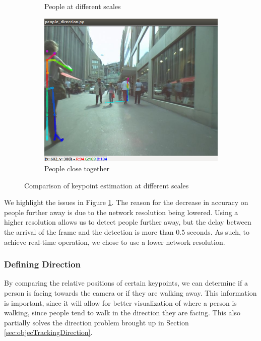 \begin{figure}[ht]
\begin{subfigure}[b]{.32\textwidth}
		\caption{People at different scales}
	\end{subfigure}
	\hspace{\fill} 
	\begin{subfigure}[b]{.32\textwidth}
		\centering
		\includegraphics[width=1.0\linewidth]{img/chapter5_implementation/openposeKP2.png}
		\caption{People close together}
	\end{subfigure}
	\vspace{-1\baselineskip}
	\begin{center}
		\caption{Comparison of keypoint estimation at different scales}
		\label{fig:openposeKP}
	\end{center}
		\vspace{-1.5\baselineskip}
\end{figure}

We highlight the issues in Figure \ref{fig:openposeKP}. The reason for the decrease in accuracy on people further away is due to the network resolution being lowered. Using a higher resolution allows us to detect people further away, but the delay between the arrival of the frame and the detection is more than 0.5 seconds. As such, to achieve real-time operation, we chose to use a lower network resolution.

\subsubsection{Defining Direction}
By comparing the relative positions of certain keypoints, we can determine if a person is facing towards the camera or if they are walking away. This information is important, since it will allow for better visualization of where a person is walking, since people tend to walk in the direction they are facing. This also partially solves the direction problem brought up in Section \ref{sec:objecTrackingDirection}.

